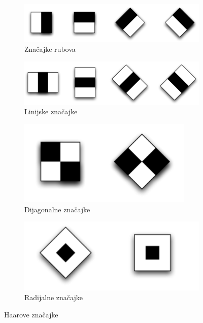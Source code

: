 \begin{figure}[htb]
	\centering
	\begin{subfigure}[b]{0.4\linewidth}
		\includegraphics[width=\linewidth]{img/EdgeFeatures.png}
		\caption{Značajke rubova}
		\label{img:haar-features1}
	\end{subfigure}
	\begin{subfigure}[b]{0.4\linewidth}
		\includegraphics[width=\linewidth]{img/LineFeatures.png}
		\caption{Linijske značajke}
		\label{img:haar-features2}
	\end{subfigure}
	\begin{subfigure}[b]{0.4\linewidth}
		\includegraphics[width=\linewidth]{img/DiagonalFeatures.png}
		\caption{Dijagonalne značajke}
		\label{img:haar-features3}
	\end{subfigure}
	\begin{subfigure}[b]{0.4\linewidth}
		\includegraphics[width=\linewidth]{img/CenterSorround.png}
		\caption{Radijalne značajke}
		\label{img:haar-features4}
	\end{subfigure}
	\caption{Haarove značajke}
	\label{img:haar-features}
\end{figure}

